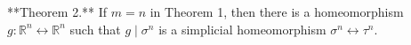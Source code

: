 **Theorem 2.** If $m = n$ in Theorem 1, then there is a homeomorphism $g: \mathbb{R}^n \leftrightarrow \mathbb{R}^n$ such that $g \mid \sigma^n$ is a simplicial homeomorphism $\sigma^n \leftrightarrow \tau^n$.
